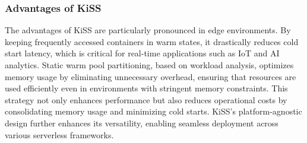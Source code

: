 \subsubsection{Advantages of KiSS}

The advantages of KiSS are particularly pronounced in edge environments. By keeping frequently accessed containers in warm states, it drastically reduces cold start latency, which is critical for real-time applications such as IoT and AI analytics. Static warm pool partitioning, based on workload analysis, optimizes memory usage by eliminating unnecessary overhead, ensuring that resources are used efficiently even in environments with stringent memory constraints. This strategy not only enhances performance but also reduces operational costs by consolidating memory usage and minimizing cold starts. KiSS’s platform-agnostic design further enhances its versatility, enabling seamless deployment across various serverless frameworks.

